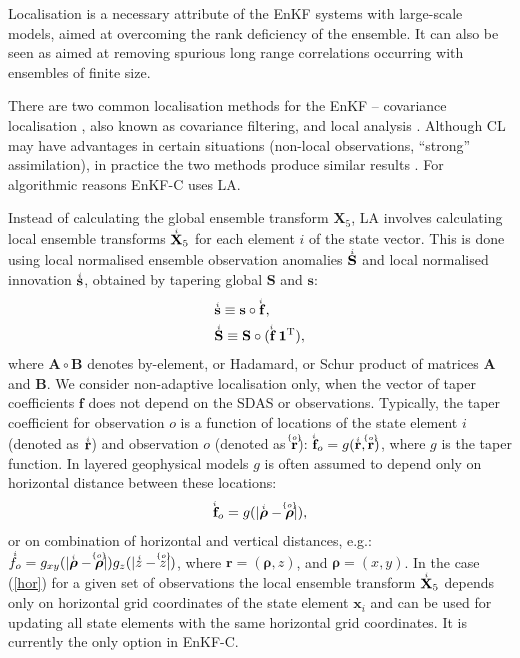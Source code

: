 \documentclass[11pt]{report}
\newcommand{\mb} {\mathbf}
\newcommand{\ms} {\boldsymbol}
\newcommand{\T}{^{\tiny \mathrm T}}
\newcommand{\ac}{\accentset}
\begin{document}
Localisation is a necessary attribute of the EnKF systems with large-scale models, aimed at overcoming the rank deficiency of the ensemble.
It can also be seen as aimed at removing spurious long range correlations occurring with ensembles of finite size.

There are two common localisation methods for the EnKF -- covariance localisation \citep[CL,][]{ham01b, hou01a}, also known as covariance filtering, and local analysis \citep[LA,][]{eve03a, ott03a}.
Although CL may have advantages in certain situations (non-local observations, ``strong'' assimilation), in practice the two methods produce similar results \citep{sak11a}.
For algorithmic reasons EnKF-C uses LA.

Instead of calculating the global ensemble transform $\mb X_5$, LA involves calculating local ensemble transforms $\ac{i}{\mb X}_5$ for each element $i$ of the state vector.
This is done using local normalised ensemble observation anomalies $\ac{i}{\mb S}$ and local normalised innovation $\ac{i}{\mb s}$, obtained by tapering global $\mb S$ and $\mb s$:
\begin{subequations}
  \begin{align}
    &\ac{i}{\mb s} \equiv \mb s \circ \ac{i}{\mb f},\\
    &\ac{i}{\mb S} \equiv \mb S \circ (\ac{i}{\mb f} \, \mb 1\T),
  \end{align}
\end{subequations}
where $\mb A \circ \mb B$ denotes by-element, or Hadamard, or Schur product of matrices $\mb A$ and $\mb B$.
We consider non-adaptive localisation only, when the vector of taper coefficients $\mb f$ does not depend on the SDAS or observations.
Typically, the taper coefficient for observation $o$ is a function of locations of the state element $i$ (denoted as $\ac{i}{\mb r}$) and observation $o$ (denoted as $\ac{\{o\}}{\mb r}$): $\ac{i}{\mb f}_o = g(\ac{i}{\mb r}, \ac{\{o\}}{\mb r})$, where $g$ is the taper function.
In layered geophysical models $g$ is often assumed to depend only on horizontal distance between these locations: 
\begin{align}
  \label{hor}
  \ac{i}{\mb f}_o = g(|\ac{i}{\ms \rho} - \ac{\{o\}}{\ms \rho}|),
\end{align}
or on combination of horizontal and vertical distances, e.g.: $\ac{i}f_o = g_{xy}(|\ac{i}{\ms \rho} - \ac{\{o\}}{\ms \rho}|)g_z(|\ac{i}z - \ac{\{o\}}z|)$, where $\mb r = (\ms \rho, z)$, and $\ms \rho = (x, y)$.
In the case (\ref{hor}) for a given set of observations the local ensemble transform $\ac{i}{\mb X}_5$ depends only on horizontal grid coordinates of the state element $\mb x_i$ and can be used for updating all state elements with the same horizontal grid coordinates.
It is currently the only option in EnKF-C.
\end{document}
